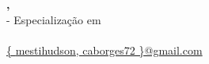 \begin{center}
  \begin{singlespace}
  \textbf{
    \Large{\titulo\\}
    \large{\subtitulo\\}
  }
  \vspace*{.5cm}
    \normalsize{
      \textbf{
        \autor,
        \orientador\\
      }
    }
  \vspace*{.5cm}
  \small{
    \instituicao -
    Especialização em \formacao\\
    \instituicaoendereco\\
  }
  \vspace*{.5cm}
  {
    \ttfamily
    \footnotesize{
      \color{blue}
      \underline{
        \{
          \href{mailto:mestihudson@gmail.com}{mestihudson},
          \href{mailto:caborges72@gmail.com}{caborges72}
        \}@gmail.com
      }
    }
  }
  \end{singlespace}
\end{center}
